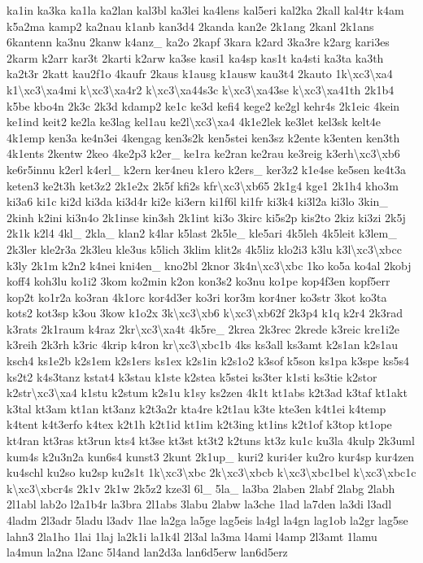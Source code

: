 {ka1in ka3ka ka1la ka2lan kal3bl ka3lei ka4lens kal5eri kal2ka 2kall kal4tr k4am k5a2ma kamp2 ka2nau k1anb kan3d4 2kanda kan2e 2k1ang 2kanl 2k1ans 6kantenn ka3nu 2kanw k4anz\-\_\- ka2o 2kapf 3kara k2ard 3ka3re k2arg kari3es 2karm k2arr kar3t 2karti k2arw ka3se kasi1 ka4sp kas1t ka4sti ka3ta ka3th ka2t3r 2katt kau2f1o 4kaufr 2kaus k1ausg k1ausw kau3t4 2kauto 1k\textbackslash{}xc3\textbackslash{}xa4 k1\textbackslash{}xc3\textbackslash{}xa4mi k\textbackslash{}xc3\textbackslash{}xa4r2 k\textbackslash{}xc3\textbackslash{}xa44s3c k\textbackslash{}xc3\textbackslash{}xa43se k\textbackslash{}xc3\textbackslash{}xa41th 2k1b4 k5be kbo4n 2k3c 2k3d kdamp2 ke1c ke3d kefi4 kege2 ke2gl kehr4s 2k1eic 4kein ke1ind keit2 ke2la ke3lag kel1au ke2l\textbackslash{}xc3\textbackslash{}xa4 4k1e2lek ke3let kel3sk kelt4e 4k1emp ken3a ke4n3ei 4kengag ken3s2k ken5stei ken3sz k2ente k3enten ken3th 4k1ents 2kentw 2keo 4ke2p3 k2er\-\_\- ke1ra ke2ran ke2rau ke3reig k3erh\textbackslash{}xc3\textbackslash{}xb6 ke6r5innu k2erl k4erl\-\_\- k2ern ker4neu k1ero k2ers\-\_\- ker3z2 k1e4se ke5sen ke4t3a keten3 ke2t3h ket3z2 2k1e2x 2k5f kfi2s kfr\textbackslash{}xc3\textbackslash{}xb65 2k1g4 kge1 2k1h4 kho3m ki3a6 ki1c ki2d ki3da ki3d4r ki2e ki3ern ki1f6l ki1fr ki3k4 ki3l2a ki3lo 3kin\-\_\- 2kinh k2ini ki3n4o 2k1inse kin3sh 2k1int ki3o 3kirc ki5s2p kis2to 2kiz ki3zi 2k5j 2k1k k2l4 4kl\-\_\- 2kla\-\_\- klan2 k4lar k5last 2k5le\-\_\- kle5ari 4k5leh 4k5leit k3lem\-\_\- 2k3ler kle2r3a 2k3leu kle3us k5lich 3klim klit2s 4k5liz klo2i3 k3lu k3l\textbackslash{}xc3\textbackslash{}xbcc k3ly 2k1m k2n2 k4nei kni4en\-\_\- kno2bl 2knor 3k4n\textbackslash{}xc3\textbackslash{}xbc 1ko ko5a ko4al 2kobj koff4 koh3lu ko1i2 3kom ko2min k2on kon3s2 ko3nu ko1pe kop4f3en kopf5err kop2t ko1r2a ko3ran 4k1orc kor4d3er ko3ri kor3m kor4ner ko3str 3kot ko3ta kots2 kot3sp k3ou 3kow k1o2x 3k\textbackslash{}xc3\textbackslash{}xb6 k\textbackslash{}xc3\textbackslash{}xb62f 2k3p4 k1q k2r4 2k3rad k3rats 2k1raum k4raz 2kr\textbackslash{}xc3\textbackslash{}xa4t 4k5re\-\_\- 2krea 2k3rec 2krede k3reic kre1i2e k3reih 2k3rh k3ric 4krip k4ron kr\textbackslash{}xc3\textbackslash{}xbc1b 4ks ks3all ks3amt k2s1an k2s1au ksch4 ks1e2b k2s1em k2s1ers ks1ex k2s1in k2s1o2 k3sof k5son ks1pa k3spe ks5s4 ks2t2 k4s3tanz kstat4 k3stau k1ste k2stea k5stei ks3ter k1sti ks3tie k2stor k2str\textbackslash{}xc3\textbackslash{}xa4 k1stu k2stum k2s1u k1sy ks2zen 4k1t kt1abs k2t3ad k3taf kt1akt k3tal kt3am kt1an kt3anz k2t3a2r kta4re k2t1au k3te kte3en k4t1ei k4temp k4tent k4t3erfo k4tex k2t1h k2t1id kt1im k2t3ing kt1ins k2t1of k3top kt1ope kt4ran kt3ras kt3run kts4 kt3se kt3st kt3t2 k2tuns kt3z ku1c ku3la 4kulp 2k3uml kum4s k2u3n2a kun6s4 kunst3 2kunt 2k1up\-\_\- kuri2 kuri4er ku2ro kur4sp kur4zen ku4schl ku2so ku2sp ku2s1t 1k\textbackslash{}xc3\textbackslash{}xbc 2k\textbackslash{}xc3\textbackslash{}xbcb k\textbackslash{}xc3\textbackslash{}xbc1bel k\textbackslash{}xc3\textbackslash{}xbc1c k\textbackslash{}xc3\textbackslash{}xbcr4s 2k1v 2k1w 2k5z2 kze3l 6l\-\_\- 5la\-\_\- la3ba 2laben 2labf 2labg 2labh 2l1abl lab2o l2a1b4r la3bra 2l1abs 3labu 2labw la3che 1lad la7den la3di l3adl 4ladm 2l3adr 5ladu l3adv 1lae la2ga la5ge lag5eis la4gl la4gn lag1ob la2gr lag5se lahn3 2la1ho 1lai 1laj la2k1i la1k4l 2l3al la3ma l4ami l4amp 2l3amt 1lamu la4mun la2na l2anc 5l4and lan2d3a lan6d5erw lan6d5erz }
